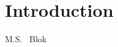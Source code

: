 \graphicspath{{./ch_introduction/figures/}}

\chapter{Introduction}
\label{ch:intro}

\begin{center} 
    \vspace{-1cm} {M.S. ~Blok} 
\end{center}


\clearpage




